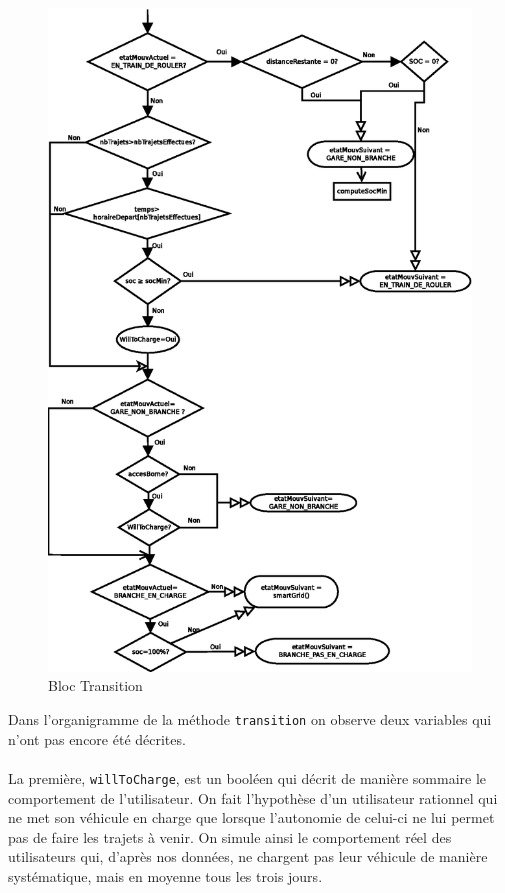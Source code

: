 			\begin{figure}[h]
				\centering
				\caption{Bloc Transition \label{fig.flowTransition}}
				\includegraphics[height=0.9\textheight]{fig/flowTransition.eps}
			\end{figure}
			
			
			Dans l’organigramme de la méthode \texttt{transition} on observe deux variables qui n'ont pas encore été décrites.
			
			\paragraph{}La première,  \texttt{willToCharge}, est un booléen qui décrit de manière sommaire le comportement de l'utilisateur. On fait l'hypothèse d'un utilisateur rationnel qui ne met son véhicule en charge que lorsque l'autonomie de celui-ci ne lui permet pas de faire les trajets à venir. On simule ainsi le comportement réel des utilisateurs qui, d'après nos données, ne chargent pas leur véhicule de manière systématique, mais en moyenne tous les trois jours.
			
